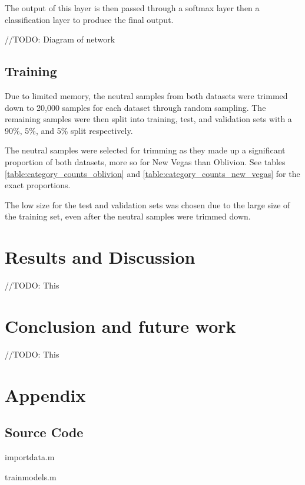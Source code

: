 \documentclass[journal]{IEEEtran}
\begin{document}
The output of this layer is then passed through a softmax layer then a classification layer
to produce the final output.

//TODO: Diagram of network

\subsection{Training}
Due to limited memory, the neutral samples from both datasets were trimmed down to 20,000
samples for each dataset through random sampling. The remaining samples were then split into training, test, and
validation sets with a 90\%, 5\%, and 5\% split respectively.

The neutral samples were selected for trimming as they made up a significant proportion of both
datasets, more so for New Vegas than Oblivion. See tables \ref{table:category_counts_oblivion}
and \ref{table:category_counts_new_vegas} for the exact proportions.

The low size for the test and validation sets was chosen due to the large size of the training set,
even after the neutral samples were trimmed down.

\section{Results and Discussion}
//TODO: This

\section{Conclusion and future work}
//TODO: This


\section*{Appendix}
\subsection*{Source Code}

import\textunderscore data.m


train\textunderscore models.m






\end{document}
